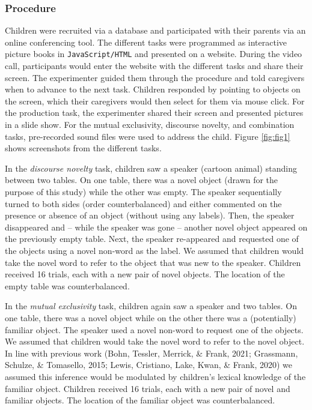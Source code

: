 \documentclass[
  man,floatsintext]{apa6}
\begin{document}
\hypertarget{procedure}{%
\subsubsection{Procedure}\label{procedure}}

Children were recruited via a database and participated with their parents via an online conferencing tool. The different tasks were programmed as interactive picture books in \texttt{JavaScript/HTML} and presented on a website. During the video call, participants would enter the website with the different tasks and share their screen. The experimenter guided them through the procedure and told caregivers when to advance to the next task. Children responded by pointing to objects on the screen, which their caregivers would then select for them via mouse click. For the production task, the experimenter shared their screen and presented pictures in a slide show. For the mutual exclusivity, discourse novelty, and combination tasks, pre-recorded sound files were used to address the child. Figure \ref{fig:fig1} shows screenshots from the different tasks.

In the \emph{discourse novelty} task, children saw a speaker (cartoon animal) standing between two tables. On one table, there was a novel object (drawn for the purpose of this study) while the other was empty. The speaker sequentially turned to both sides (order counterbalanced) and either commented on the presence or absence of an object (without using any labels). Then, the speaker disappeared and -- while the speaker was gone -- another novel object appeared on the previously empty table. Next, the speaker re-appeared and requested one of the objects using a novel non-word as the label. We assumed that children would take the novel word to refer to the object that was new to the speaker. Children received 16 trials, each with a new pair of novel objects. The location of the empty table was counterbalanced.

In the \emph{mutual exclusivity} task, children again saw a speaker and two tables. On one table, there was a novel object while on the other there was a (potentially) familiar object. The speaker used a novel non-word to request one of the objects. We assumed that children would take the novel word to refer to the novel object. In line with previous work (Bohn, Tessler, Merrick, \& Frank, 2021; Grassmann, Schulze, \& Tomasello, 2015; Lewis, Cristiano, Lake, Kwan, \& Frank, 2020) we assumed this inference would be modulated by children's lexical knowledge of the familiar object. Children received 16 trials, each with a new pair of novel and familiar objects. The location of the familiar object was counterbalanced.
\end{document}

